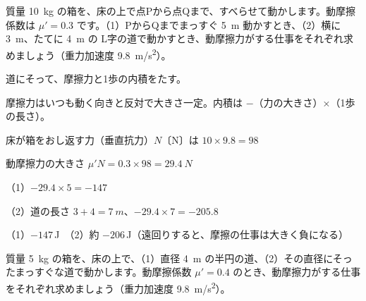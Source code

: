\begin{reidai}[摩擦力の仕事]
質量 \qty{10}{kg} の箱を、床の上で点Pから点Qまで、すべらせて動かします。動摩擦係数は $\mu'=0.3$ です。（1）PからQまでまっすぐ \qty{5}{m} 動かすとき、（2）横に \qty{3}{m}、たてに \qty{4}{m} の L字の道で動かすとき、動摩擦力がする仕事をそれぞれ求めましょう（重力加速度 \qty{9.8}{m/s^2}）。\par
\kangaekata {}\par
{}\enspace 道にそって、摩擦力と1歩の内積をたす。\par
{}\enspace 摩擦力はいつも動く向きと反対で大きさ一定。内積は $-$（力の大きさ）×（1歩の長さ）。\par
\shiki\kviiihs{}\zw{} 床が箱をおし返す力（垂直抗力）$N$〔N〕は $10\times9.8=98$\par
\kviiiha 動摩擦力の大きさ $\mu'N=0.3\times98=\qty{29.4}{N}$\par
\kviiiha （1）$-29.4\times5=-147$\par
\kviiiha （2）道の長さ $3+4=\qty{7}{m}$、$-29.4\times7=-205.8$\par
\kotae （1）$-147$\,J　（2）約 $-206$\,J（遠回りすると、摩擦の仕事は大きく負になる）
\end{reidai}

\begin{jibun}
質量 \qty{5}{kg} の箱を、床の上で、（1）直径 \qty{4}{m} の半円の道、（2）その直径にそったまっすぐな道で動かします。動摩擦係数 $\mu'=0.4$ のとき、動摩擦力がする仕事をそれぞれ求めましょう（重力加速度 \qty{9.8}{m/s^2}）。
\end{jibun}

